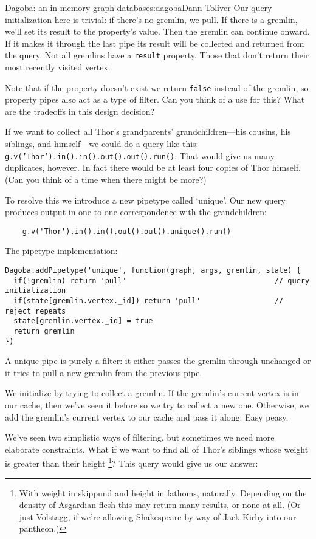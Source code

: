 \begin{aosachapter}{Dagoba: an in-memory graph database}{s:dagoba}{Dann Toliver}
Our query initialization here is trivial: if there's no gremlin, we
pull. If there is a gremlin, we'll set its result to the property's
value. Then the gremlin can continue onward. If it makes it through the
last pipe its result will be collected and returned from the query. Not
all gremlins have a \texttt{result} property. Those that don't return
their most recently visited vertex.

Note that if the property doesn't exist we return \texttt{false} instead
of the gremlin, so property pipes also act as a type of filter. Can you
think of a use for this? What are the tradeoffs in this design decision?

\label{unique}

If we want to collect all Thor's grandparents' grandchildren---his
cousins, his siblings, and himself---we could do a query like this:
\texttt{g.v('Thor').in().in().out().out().run()}. That would give us
many duplicates, however. In fact there would be at least four copies of
Thor himself. (Can you think of a time when there might be more?)

To resolve this we introduce a new pipetype called `unique'. Our new
query produces output in one-to-one correspondence with the
grandchildren:

\begin{verbatim}
    g.v('Thor').in().in().out().out().unique().run()
\end{verbatim}

The pipetype implementation:

\begin{verbatim}
Dagoba.addPipetype('unique', function(graph, args, gremlin, state) {
  if(!gremlin) return 'pull'                                  // query initialization
  if(state[gremlin.vertex._id]) return 'pull'                 // reject repeats
  state[gremlin.vertex._id] = true
  return gremlin
})
\end{verbatim}

A unique pipe is purely a filter: it either passes the gremlin through
unchanged or it tries to pull a new gremlin from the previous pipe.

We initialize by trying to collect a gremlin. If the gremlin's current
vertex is in our cache, then we've seen it before so we try to collect a
new one. Otherwise, we add the gremlin's current vertex to our cache and
pass it along. Easy peasy.

\label{filter}

We've seen two simplistic ways of filtering, but sometimes we need more
elaborate constraints. What if we want to find all of Thor's siblings
whose weight is greater than their height \footnote{With weight in
  skippund and height in fathoms, naturally. Depending on the density of
  Asgardian flesh this may return many results, or none at all. (Or just
  Volstagg, if we're allowing Shakespeare by way of Jack Kirby into our
  pantheon.)}? This query would give us our answer:


\end{aosachapter}
